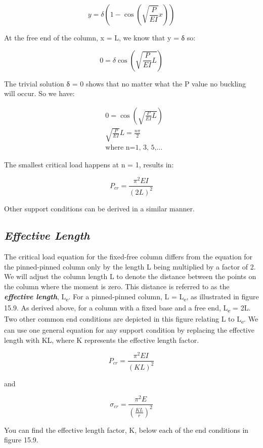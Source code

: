 \documentclass[
  letterpaper,
  DIV=11,
  numbers=noendperiod]{scrreprt}
\begin{document}
\[
y=\delta\left(1-\cos \left(\sqrt{\frac{P}{E I}} x\right)\right)
\]

At the free end of the column, x = L, we know that y = δ so:

\[
0=\delta \cos \left(\sqrt{\frac{P}{E I} L}\right)
\]

The trivial solution δ = 0 shows that no matter what the P value no
buckling will occur. So we have:

\[
\begin{aligned}
& 0=\cos \left(\sqrt{\frac{P}{E I} L}\right) \\
& \sqrt{\frac{P}{E I}} L=\frac{n \pi}{2} \\
& \text{where n=1, 3, 5,...}
\end{aligned}
\]

The smallest critical load happens at n = 1, results in:

\[
P_{c r}=\frac{\pi^2 E I}{(2 L)^2}
\]

Other support conditions can be derived in a similar manner.

\subsection{\texorpdfstring{\emph{Effective
Length}}{Effective Length}}\label{effective-length}

The critical load equation for the fixed-free column differs from the
equation for the pinned-pinned column only by the length L being
multiplied by a factor of 2. We will adjust the column length L to
denote the distance between the points on the column where the moment is
zero. This distance is referred to as the \textbf{\emph{effective
length}}, L\textsubscript{e}. For a pinned-pinned column, L =
L\textsubscript{e}, as illustrated in figure 15.9. As derived above, for
a column with a fixed base and a free end, L\textsubscript{e} = 2L. Two
other common end conditions are depicted in this figure relating L to
L\textsubscript{e}. We can use one general equation for any support
condition by replacing the effective length with KL, where K represents
the effective length factor.

\[
P_{c r}=\frac{\pi^2 E I}{(K L)^2}
\]

and

\[
\sigma_{c r}=\frac{\pi^2 E}{\left(\frac{K L}{r}\right)^2}
\]

You can find the effective length factor, K, below each of the end
conditions in figure 15.9.
\end{document}
